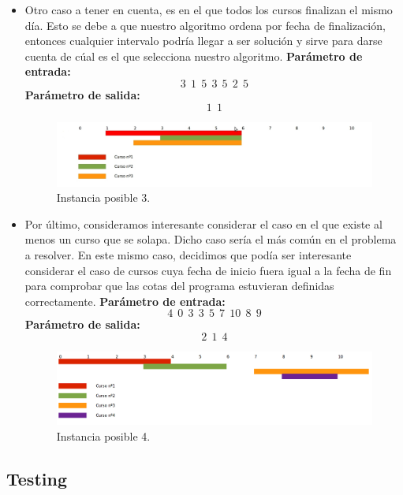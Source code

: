 \begin{itemize}
\item Otro caso a tener en cuenta, es en el que todos los cursos finalizan el mismo día. Esto se debe a que nuestro algoritmo ordena por fecha de finalización, entonces cualquier intervalo podría llegar a ser solución y sirve para darse cuenta de cúal es el que selecciona nuestro algoritmo. \newline
\textbf{Parámetro de entrada:}  $$3\ \ 1\ \ 5\ \ 3\ \ 5\ \ 2\ \ 5$$
\textbf{Parámetro de salida:}  $$1\ \ 1$$\newline

\begin{figure}[H] %
\begin{center}
\includegraphics[width=450pt]{../imgs/instancia3.jpg}
\end{center}
\caption{Instancia posible 3.}
\end{figure}

\item Por último, consideramos interesante considerar el caso en el que existe al menos un curso que se solapa. Dicho caso sería el más común en el problema a resolver. En este mismo caso, decidimos que podía ser interesante considerar el caso de cursos cuya fecha de inicio fuera igual a la fecha de fin para comprobar que las cotas del programa estuvieran definidas correctamente.\newline
\textbf{Parámetro de entrada:}  $$4\ \ 0\ \ 3\ \ 3\ \ 5\ \ 7\ \ 10\ \ 8\ \ 9$$
\textbf{Parámetro de salida:}  $$2\ \ 1\ \ 4$$ \newline

\begin{figure}[H] %
\begin{center}
\includegraphics[width=450pt]{../imgs/instancia1.jpg}
\end{center}
\caption{Instancia posible 4.}
\end{figure}

\end{itemize}



\subsection{Testing}
